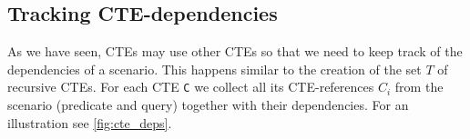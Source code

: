 

\subsection{Tracking CTE-dependencies}\label{tracking_cte_dependencies}
As we have seen, CTEs may use other CTEs so that we need to keep track of the dependencies of a scenario. This happens similar to the creation of the set $T$ of recursive CTEs. For each CTE \texttt{C} we collect all its CTE-references \texttt{$C_i$} from the scenario (predicate and query) together with their dependencies. For an illustration see \autoref{fig:cte_deps}.

